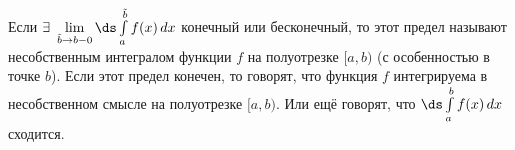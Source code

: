 
   	Если $\exists\ \lim\limits_{\tilde b\to b-0}\ds\int\limits_a^{\tilde b}f(x)\,dx$ конечный или бесконечный, то этот предел называют несобственным интегралом функции $f$ на полуотрезке $[a,b)$
   	(с особенностью в точке $b$). Если этот предел конечен, то говорят, что функция $f$ интегрируема в несобственном смысле на полуотрезке $[a,b)$.
   	Или ещё говорят, что $\ds\int\limits_a^bf(x)\,dx$ сходится.
   